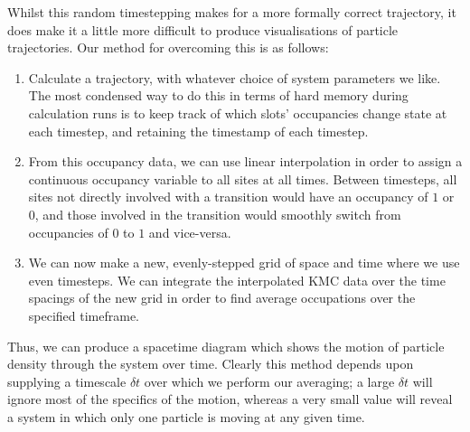 Whilst this random timestepping makes for a more formally correct trajectory, it does make it a
little more difficult to produce visualisations of particle trajectories. Our method for overcoming
this is as follows:
\begin{enumerate}
 \item Calculate a trajectory, with whatever choice of system parameters we like. The most 
 condensed way to do this in terms of hard memory during calculation runs is to keep track of which
 slots' occupancies change state at each 
 timestep, and retaining the timestamp of each timestep.
 \item From this occupancy data, we can use linear interpolation in order to assign a continuous
 occupancy variable to all sites at all times. Between timesteps, all sites not directly involved
 with a transition would have an occupancy of $1$ or $0$, and those involved in the transition
 would smoothly switch from occupancies of $0$ to $1$ and vice-versa.
 \item We can now make a new, evenly-stepped grid of space and time where we use even timesteps.
 We can integrate the interpolated KMC data over the time spacings of the new grid in order to
 find average occupations over the specified timeframe. 
\end{enumerate}
Thus, we can produce a spacetime diagram which shows the motion of particle density through the 
system over time. Clearly this method depends upon supplying a timescale $\delta t$ over which we
perform our averaging; a large $\delta t$ will ignore most of the specifics of the motion, whereas
a very small value will reveal a system in which only one particle is moving at any given time.

